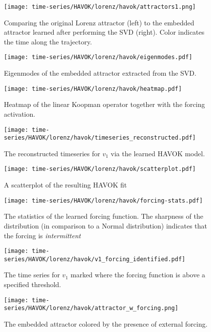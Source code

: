 \begin{figure}[h]
  \centering
  \texttt{[image: time-series/HAVOK/lorenz/havok/attractors1.png]}
  \caption{Comparing the original Lorenz attractor (left) to the embedded attractor learned after performing the SVD (right). Color indicates the time along the trajectory.}
\end{figure}

\begin{figure}[h]
  \centering
  \texttt{[image: time-series/HAVOK/lorenz/havok/eigenmodes.pdf]}
  \caption{Eigenmodes of the embedded attractor extracted from the SVD.}
\end{figure}

\begin{figure}[h]
  \centering
  \texttt{[image: time-series/HAVOK/lorenz/havok/heatmap.pdf]}
  \caption{Heatmap of the linear Koopman operator together with the forcing activation.}
\end{figure}

\begin{figure}[h]
  \centering
  \texttt{[image: time-series/HAVOK/lorenz/havok/timeseries\_reconstructed.pdf]}
  \caption{The reconstructed timeseries for $v_1$ via the learned HAVOK model.}
\end{figure}

\begin{figure}[h]
  \centering
  \texttt{[image: time-series/HAVOK/lorenz/havok/scatterplot.pdf]}
  \caption{A scatterplot of the resulting HAVOK fit}
\end{figure}

\begin{figure}[h]
  \centering
  \texttt{[image: time-series/HAVOK/lorenz/havok/forcing-stats.pdf]}
  \caption{The statistics of the learned forcing function. The sharpness of the distribution (in comparison to a Normal distribution) indicates that the forcing is \textit{intermittent}}
\end{figure}

\begin{figure}[h]
  \centering
  \texttt{[image: time-series/HAVOK/lorenz/havok/v1\_forcing\_identified.pdf]}
  \caption{The time series for $v_1$ marked where the forcing function is above a specified threshold.}
\end{figure}


\begin{figure}[h]
  \centering
  \texttt{[image: time-series/HAVOK/lorenz/havok/attractor\_w\_forcing.png]}
  \caption{The embedded attractor colored by the presence of external forcing.}
\end{figure}

